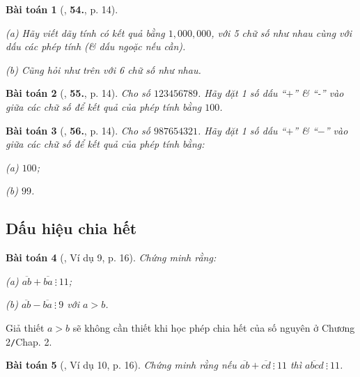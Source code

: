 \documentclass{article}
\numberwithin{equation}{section}
\newtheorem{baitoan}{Bài toán}[section]
\begin{document}
\begin{baitoan}[\cite{Binh_Toan_6_tap_1}, \textbf{54.}, p. 14]
	\begin{enumerate*}
		\item[(a)] Hãy viết dãy tính có kết quả bằng $1,000,000$, với 5 chữ số như nhau cùng với dấu các phép tính (\& dấu ngoặc nếu cần).
		\item[(b)] Cũng hỏi như trên với 6 chữ số như nhau.
	\end{enumerate*}
\end{baitoan}

\begin{baitoan}[\cite{Binh_Toan_6_tap_1}, \textbf{55.}, p. 14]
	Cho số $123456789$. Hãy đặt 1 số dấu ``$+$'' \& ``-'' vào giữa các chữ số để kết quả của phép tính bằng $100$.
\end{baitoan}

\begin{baitoan}[\cite{Binh_Toan_6_tap_1}, \textbf{56.}, p. 14]
	Cho số $987654321$. Hãy đặt 1 số dấu ``$+$'' \& ``$-$'' vào giữa các chữ số để kết quả của phép tính bằng:
	\begin{enumerate*}
		\item[(a)] $100$;
		\item[(b)] $99$.
	\end{enumerate*}
\end{baitoan}

\subsection{Dấu hiệu chia hết}

\begin{baitoan}[\cite{Binh_Toan_6_tap_1}, Ví dụ 9, p. 16]
	Chứng minh rằng:
	\begin{enumerate*}
		\item[(a)] $\overline{ab} + \overline{ba}\ \vdots\ 11$;
		\item[(b)] $\overline{ab} - \overline{ba}\ \vdots\ 9$ với $a > b$.
	\end{enumerate*}
\end{baitoan}
Giả thiết $a > b$ sẽ không cần thiết khi học phép chia hết của số nguyên ở Chương 2\texttt{/}Chap. 2.

\begin{baitoan}[\cite{Binh_Toan_6_tap_1}, Ví dụ 10, p. 16]
	Chứng minh rằng nếu $\overline{ab} + \overline{cd}\ \vdots\ 11$ thì $\overline{abcd}\ \vdots\ 11$.
\end{baitoan}
\end{document}
